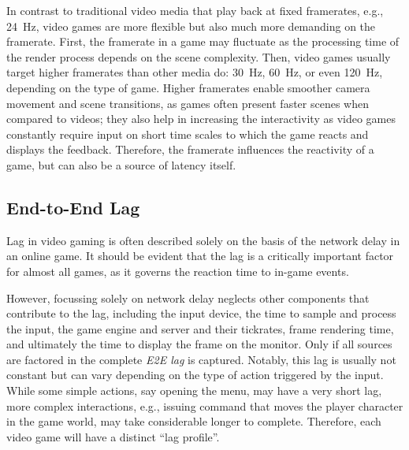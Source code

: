 In contrast to traditional video media that play back at fixed framerates, e.g., \SI{24}{\hertz}, video games are more flexible but also much more demanding on the framerate. First, the framerate in a game may fluctuate as the processing time of the render process depends on the scene complexity.
Then, video games usually target higher framerates than other media do: \SI{30}{\hertz}, \SI{60}{\hertz}, or even \SI{120}{\hertz}, depending on the type of game. Higher framerates enable smoother camera movement and scene transitions, as games often present faster scenes when compared to videos; they also help in increasing the interactivity as video games constantly require input on short time scales to which the game reacts and displays the feedback. Therefore, the framerate influences the reactivity of a game, but can also be a source of latency itself.


\subsection{End-to-End Lag}
\label{sec:e2e-lag}

Lag in video gaming is often described solely on the basis of the network delay in an online game. It should be evident that the lag is a critically important factor for almost all games, as it governs the reaction time to in-game events.

However, focussing solely on network delay neglects other components that contribute to the lag, including the input device, the time to sample and process the input, the game engine and server and their tickrates, frame rendering time, and ultimately the time to display the frame on the monitor. Only if all sources are factored in the complete \textit{\gls{E2E} lag} is captured. Notably, this lag is usually not constant but can vary depending on the type of action triggered by the input. While some simple actions, say opening the menu, may have a very short lag, more complex interactions, e.g., issuing command that moves the player character in the game world, may take considerable longer to complete. %
Therefore, each video game will have a distinct ``lag profile''.


